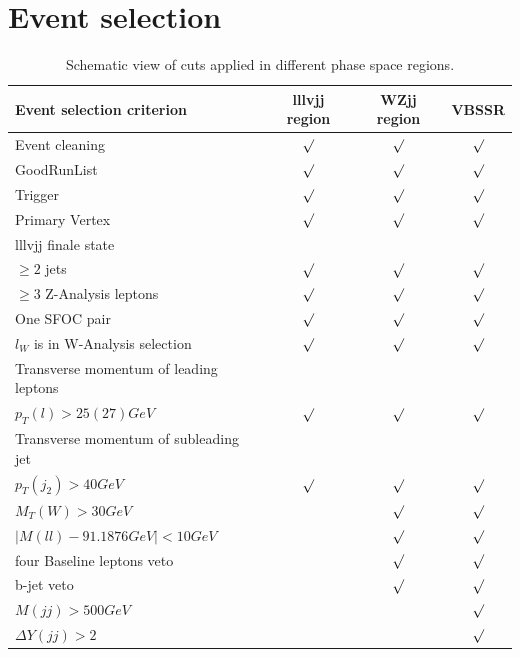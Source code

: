\documentclass[../Bachelorarbeit.tex]{subfiles}
\begin{document}
\section{Event selection}
\label{sec:Event_selection}
\begin{table}[h]
    \begin{tabular}{  l c c c }
        \hline
        Event selection criterion                 & lllvjj region & WZjj region & VBSSR   \\
        \hline
        Event cleaning                            & $\surd$       & $\surd$     & $\surd$ \\
        GoodRunList                               & $\surd$       & $\surd$     & $\surd$ \\
        Trigger                                   & $\surd$       & $\surd$     & $\surd$ \\
        Primary Vertex                            & $\surd$       & $\surd$     & $\surd$ \\
        \hline
        lllvjj finale state                       &               &             &         \\
        \qquad $\geq 2$ jets                      & $\surd$       & $\surd$     & $\surd$ \\
        \qquad $\geq 3$ Z-Analysis leptons        & $\surd$       & $\surd$     & $\surd$ \\
        \qquad One SFOC pair                      & $\surd$       & $\surd$     & $\surd$ \\
        $l_{W}$ is in W-Analysis selection        & $\surd$       & $\surd$     & $\surd$ \\
        Transverse momentum of leading leptons    &               &             &         \\
        \qquad $p_{T}(l)>25(27) GeV$              & $\surd$       & $\surd$     & $\surd$ \\
        Transverse momentum of subleading jet     &               &             &         \\
        \qquad $p_{T}(j_{2})>40 GeV$              & $\surd$       & $\surd$     & $\surd$ \\
        \hline
        $M_{T}(W)>30 GeV$                         &               & $\surd$     & $\surd$ \\
        $\lvert M(ll)-91.1876 GeV\rvert < 10 GeV$ &               & $\surd$     & $\surd$ \\
        four Baseline leptons veto                &               & $\surd$     & $\surd$ \\
        b-jet veto                                &               & $\surd$     & $\surd$ \\
        \hline
        $M(jj)>500 GeV$                           &               &             & $\surd$ \\
        $\Delta Y(jj) >2$                         &               &             & $\surd$ \\
        \hline
    \end{tabular}
    \centering
    \caption{Schematic view of cuts applied in different phase space regions. \cite{Bittrich.27.05.2020}}
    \label{tab:eventselection}
\end{table}
\end{document}
